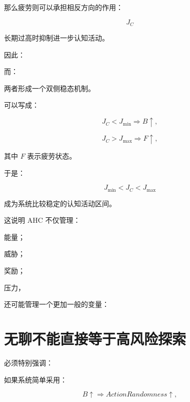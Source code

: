 那么疲劳则可以承担相反方向的作用：

\[
J_C
\]

长期过高时抑制进一步认知活动。

因此：

\begin{statementbox}
\centering
{}
\end{statementbox}

而：

\begin{statementbox}
\centering
{}
\end{statementbox}

两者形成一个双侧稳态机制。

可以写成：

\[
J_C<J_{\min}
\Rightarrow
B\uparrow,
\]

\[
J_C>J_{\max}
\Rightarrow
F\uparrow,
\]

其中 $F$ 表示疲劳状态。

于是：

\[
\boxed{
J_{\min}
<
J_C
<
J_{\max}
}
\]

成为系统比较稳定的认知活动区间。

这说明 AHC 不仅管理：

能量；

威胁；

奖励；

压力，

还可能管理一个更加一般的变量：

\begin{statementbox}
\centering
{}
\end{statementbox}

\section{无聊不能直接等于高风险探索}

必须特别强调：

\begin{statementbox}
\centering
{}
\end{statementbox}

如果系统简单采用：

\[
B\uparrow
\Rightarrow
ActionRandomness\uparrow,
\]

